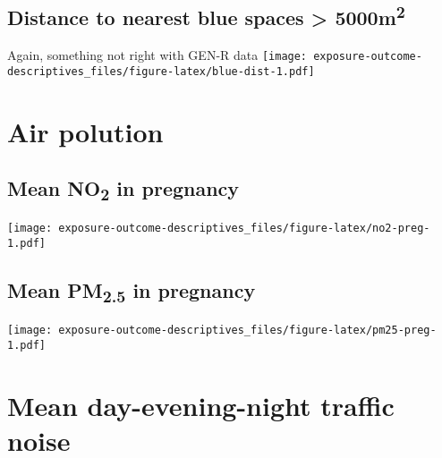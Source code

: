 \documentclass[]{article}
\newenvironment{Shaded}{\begin{snugshade}}{\end{snugshade}}
\newcommand{\FunctionTok}[1]{\textcolor[rgb]{0.00,0.00,0.00}{#1}}
\newcommand{\NormalTok}[1]{#1}
\newcommand{\SpecialCharTok}[1]{\textcolor[rgb]{0.00,0.00,0.00}{#1}}
\newcommand{\StringTok}[1]{\textcolor[rgb]{0.31,0.60,0.02}{#1}}
\begin{document}
\hypertarget{distance-to-nearest-blue-spaces-5000m2}{%
\subsection{\texorpdfstring{Distance to nearest blue spaces \textgreater{} 5000m\textsuperscript{2}}{Distance to nearest blue spaces \textgreater{} 5000m2}}\label{distance-to-nearest-blue-spaces-5000m2}}

Again, something not right with GEN-R data
\texttt{[image: exposure-outcome-descriptives\_files/figure-latex/blue-dist-1.pdf]}

\begin{Shaded}
\end{Shaded}

\hypertarget{air-polution}{%
\section{Air polution}\label{air-polution}}

\hypertarget{mean-no2-in-pregnancy}{%
\subsection{\texorpdfstring{Mean NO\textsubscript{2} in pregnancy}{Mean NO2 in pregnancy}}\label{mean-no2-in-pregnancy}}

\texttt{[image: exposure-outcome-descriptives\_files/figure-latex/no2-preg-1.pdf]}

\hypertarget{mean-pm2.5-in-pregnancy}{%
\subsection{\texorpdfstring{Mean PM\textsubscript{2.5} in pregnancy}{Mean PM2.5 in pregnancy}}\label{mean-pm2.5-in-pregnancy}}

\texttt{[image: exposure-outcome-descriptives\_files/figure-latex/pm25-preg-1.pdf]}

\hypertarget{mean-day-evening-night-traffic-noise}{%
\section{Mean day-evening-night traffic noise}\label{mean-day-evening-night-traffic-noise}}
\end{document}
